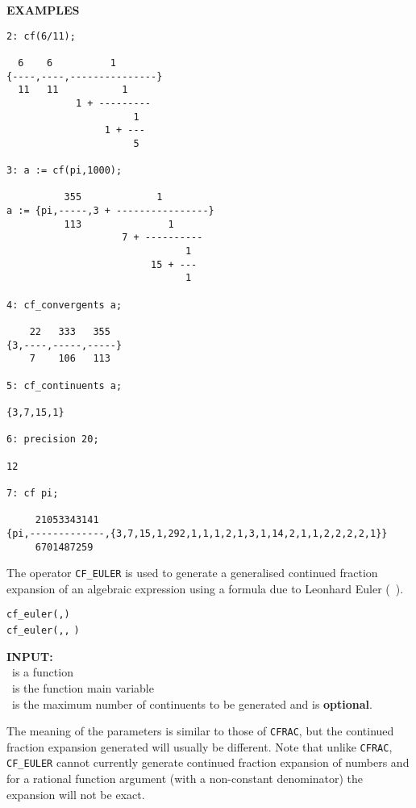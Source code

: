 \large{\textbf{EXAMPLES}}
\begin{verbatim}
2: cf(6/11);

  6    6          1
{----,----,---------------}
  11   11           1
            1 + ---------
                      1
                 1 + ---
                      5

3: a := cf(pi,1000);

          355             1
a := {pi,-----,3 + ----------------}
          113               1
                    7 + ----------
                               1
                         15 + ---
                               1

4: cf_convergents a;

    22   333   355
{3,----,-----,-----}
    7    106   113

5: cf_continuents a;

{3,7,15,1}

6: precision 20;

12

7: cf pi;

     21053343141
{pi,-------------,{3,7,15,1,292,1,1,1,2,1,3,1,14,2,1,1,2,2,2,2,1}}
     6701487259
\end{verbatim}

\hypertarget{CF_EULER:operator}{}
The operator \texttt{CF\_EULER} is used to generate a generalised
continued fraction expansion of an algebraic expression using a formula due to
Leonhard Euler (~\cite{Euler:1748}).
\begin{syntaxtable}
 \texttt{cf\_euler(}\texttt{,}\texttt{)}\\
 \texttt{cf\_euler(}\texttt{,}\texttt{,}
  \texttt{)}
\end{syntaxtable}


\textbf{INPUT:}\\
\ is a function\\
 \ is the function main variable\\
 \ is the maximum number of continuents to be generated
and is \textbf{optional}.

The meaning of the parameters is similar to those of \texttt{CFRAC}, but the
continued fraction expansion generated will usually be different. Note that
unlike \texttt{CFRAC}, \texttt{CF\_EULER} cannot currently generate
continued fraction expansion of numbers and for a rational function argument
(with a non-constant denominator) the expansion will not be exact.

